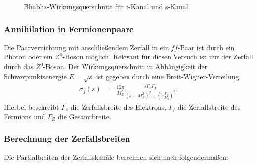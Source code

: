 \begin{figure}
	\centering
	\caption[Bhabha-Wirkungsquerschnitt für t-Kanal und s-Kanal]{Bhabha-Wirkungsquerschnitt für t-Kanal und s-Kanal.}
	\label{fig:winkelbhabhatheorie}
\end{figure}

\subsubsection{Annihilation in Fermionenpaare}
Die Paarvernichtung mit anschließendem Zerfall in ein $f\bar f$-Paar ist durch ein Photon oder ein $Z^0$-Boson möglich. Relevant für diesen Versuch ist nur der Zerfall durch das $Z^0$-Boson. Der Wirkungsquerschnitt in Abhängigkeit der Schwerpunktsenergie $E=\sqrt{s}$ ist gegeben durch eine Breit-Wigner-Verteilung:
\begin{align}
	\sigma_f(s)&=\frac{12\pi}{M_Z^2}\frac{s\Gamma_e\Gamma_f}{\left(s-M_Z^2\right)^2+\left(s\frac{\Gamma_Z}{M_z}\right)^2}\text{.}
\end{align}
Hierbei beschreibt $\Gamma_e$ die Zerfallsbreite des Elektrons, $\Gamma_f$ die Zerfallsbreite des Fermions und $\Gamma_Z$ die Gesamtbreite.

\subsubsection{Berechnung der Zerfallsbreiten}

Die Partialbreiten der Zerfallskanäle berechnen sich nach \cite{anleitungalt} folgendermaßen:

